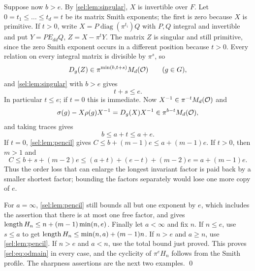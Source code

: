 Suppose now $b>e$. By \cref{sel:lem:singular}, $X$ is invertible over $F$.
Let $0=t_1\le\dots\le t_d=t$ be its matrix Smith exponents; the first is
zero because $X$ is primitive. If $t>0$, write
$X=P\operatorname{diag}(\pi^{t_i})Q$ with $P,Q$ integral and invertible and
put $Y=PE_{dd}Q$, $Z=X-\pi^tY$. The matrix $Z$ is singular and still
primitive, since the zero Smith exponent occurs in a different position
because $t>0$. Every relation on every integral matrix is divisible by
$\pi^s$, so
\[
 D_g(Z)\in\pi^{\min(b,t+s)}M_d(\mathcal{O})\qquad(g\in G),
\]
and \cref{sel:lem:singular} with $b>e$ gives
\begin{equation}\label{sel:eq:odcompensation}
 t+s\le e .
\end{equation}
In particular $t\le e$; if $t=0$ this is immediate. Now
$X^{-1}\in\pi^{-t}M_d(\mathcal{O})$ and
\[
 \sigma(g)-X\rho(g)X^{-1}=D_g(X)X^{-1}\in\pi^{b-t}M_d(\mathcal{O}),
\]
and taking traces gives
\begin{equation}\label{sel:eq:odlong}
 b\le a+t\le a+e .
\end{equation}
If $t=0$, \cref{sel:lem:pencil} gives $C\le b+(m-1)e\le a+(m-1)e$. If $t>0$,
then $m>1$ and
\[
 C\le b+s+(m-2)e\le(a+t)+(e-t)+(m-2)e=a+(m-1)e .
\]
Thus the order loss that can enlarge the longest invariant factor is paid
back by a smaller shortest factor; bounding the factors separately would
lose one more copy of $e$.

For $a=\infty$, \cref{sel:lem:pencil} still bounds all but one exponent by
$e$, which includes the assertion that there is at most one free factor, and
gives $\operatorname{length} H_n\le n+(m-1)\min(n,e)$. Finally let $a<\infty$ and fix $n$.
If $n\le e$, use $s\le a$ to get $\operatorname{length} H_n\le\min(n,a)+(m-1)n$. If $n>e$
and $a\ge n$, use \cref{sel:lem:pencil}. If $n>e$ and $a<n$, use the total
bound just proved. This proves \eqref{sel:eq:odmain} in every case, and the
cyclicity of $\pi^eH_n$ follows from the Smith profile. The sharpness
assertions are the next two examples. \qed

